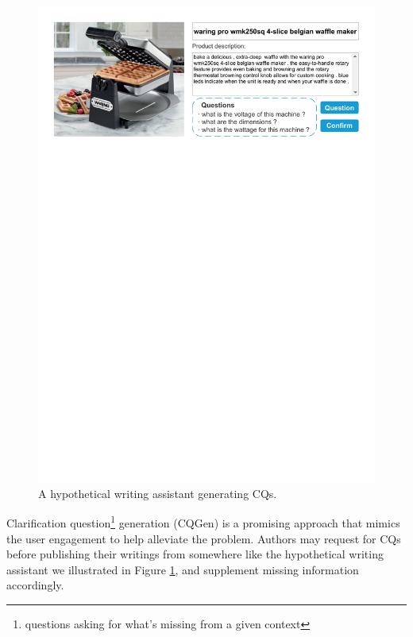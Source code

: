 \documentclass[letterpaper]{article} %
\begin{document}
\begin{figure}[htbp]
\centering
\includegraphics[width=\linewidth]{WA_UI.pdf}
\caption{A hypothetical writing assistant generating CQs.}
\label{fig:WA_UI}
\end{figure}

Clarification question\footnote{questions asking for what's missing from a given context} generation (CQGen) is a promising approach that mimics the user engagement to help alleviate the problem. Authors may request for CQs before publishing their writings from somewhere like the hypothetical writing assistant we illustrated in Figure \ref{fig:WA_UI}, and supplement missing information accordingly.
\end{document}
